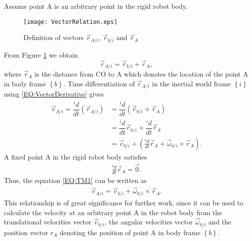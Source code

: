 Assume point A is an arbitrary point in the rigid robot body.
\begin{figure}
\centering
\texttt{[image: VectorRelation.eps]}
\caption{Definition of vectors $\vec{r}_{A/i}$, $\vec{r}_{b/i}$ and $\vec{r}_{A}$}	
\label{FIG:VectorRelation}
\end{figure}
From Figure \ref{FIG:VectorRelation} we obtain 
\begin{equation}
\vec{r}_{A/i}=\vec{r}_{b/i}+\vec{r}_{A},
\end{equation}
where $\vec{r}_{A}$ is the distance from CO to A which denotes the location of the point A in body frame $\left\{ b \right\}$. 
Time differentiation of $\vec{r}_{A/i}$ in the inertial world frame $\left\{ i \right\}$ using \ref{EQ:VectorDerivative} gives
\begin{align}
\vec{v}_{A/i}=\dfrac{^{i}d}{dt}(\vec{r}_{A/i})
&=\dfrac{^{i}d}{dt}(\vec{r}_{b/i}+\vec{r}_{A}) \nonumber \\
&=\dfrac{^{i}d}{dt}\vec{r}_{b/i}+\dfrac{^{i}d}{dt}\vec{r}_{A} \nonumber \\
&=\vec{v}_{b/i}+ (\frac{^{b}d}{dt}\vec{r}_{A}+\vec{\omega}_{b/i}\times \vec{r}_{A}). \label{EQ:TM1}
\end{align}
A fixed point A in the rigid robot body satisfies 
\begin{align}
\frac{^{b}d}{dt}\vec{r}_{A}=\vec{0}.
\end{align}
Thus, the equation \ref{EQ:TM1} can be written as
\begin{align}
 \vec{v}_{A/i}= \vec{v}_{b/i}+ \vec{\omega}_{b/i}\times \vec{r}_{A}\label{EQ:VelocityTransformation}.
\end{align} 
This relationship is of great significance for further work, since it can be used to calculate the velocity at an arbitrary point A in the robot body from the translational velocities vector $\vec{v}_{b/i}$, the angular velocities vector $\vec{\omega}_{b/i}$ and the position vector $r_{A}$ denoting the position of point A in body frame $\left\{ b \right\}$. 
